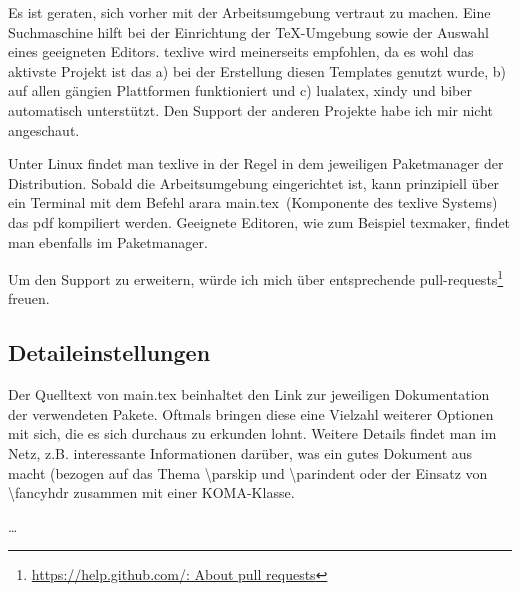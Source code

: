 Es ist geraten, sich vorher mit der Arbeitsumgebung vertraut zu machen. Eine Suchmaschine hilft bei der Einrichtung der TeX-Umgebung sowie der Auswahl eines geeigneten Editors. texlive wird meinerseits empfohlen, da es wohl das aktivste Projekt ist das a) bei der Erstellung diesen Templates genutzt wurde, b) auf allen gängien Plattformen funktioniert und c) lualatex, xindy und biber automatisch unterstützt. Den Support der anderen Projekte habe ich mir nicht angeschaut.

Unter Linux findet man texlive in der Regel in dem jeweiligen Paketmanager der Distribution. Sobald die Arbeitsumgebung eingerichtet ist, kann prinzipiell über ein Terminal mit dem Befehl \glqq arara main.tex\grqq\ (Komponente des texlive Systems) das pdf kompiliert werden.
Geeignete Editoren, wie zum Beispiel texmaker, findet man ebenfalls im Paketmanager.

Um den Support zu erweitern, würde ich mich über entsprechende pull-requests\footnote{\href{https://help.github.com/en/articles/about-pull-requests}{https://help.github.com/: About pull requests}} freuen.

\subsection{Detaileinstellungen}
Der Quelltext von main.tex beinhaltet den Link zur jeweiligen Dokumentation der verwendeten Pakete. Oftmals bringen diese eine Vielzahl weiterer Optionen mit sich, die es sich durchaus zu erkunden lohnt.
Weitere Details findet man im Netz, z.B.  interessante Informationen darüber, was ein gutes Dokument aus macht (bezogen auf das Thema \textbackslash parskip und \textbackslash parindent oder der Einsatz von \textbackslash fancyhdr zusammen mit einer KOMA-Klasse.

\dots
